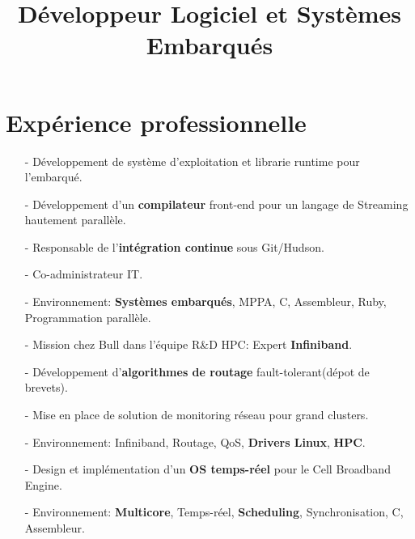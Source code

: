 \documentclass[10pt,a4paper]{moderncv}
\title{Développeur Logiciel et Systèmes \newline{}Embarqués}
\begin{document}
\maketitle
\section{Expérience professionnelle}
{
\begin{itemize}
\item[-]{Développement de système d'exploitation et librarie runtime pour l'embarqué.}
\item[-]{Développement d'un \textbf{compilateur} front-end pour un langage de Streaming hautement parallèle.}
\item[-]{Responsable de l'\textbf{intégration continue} sous Git/Hudson.}
\item[-]{Co-administrateur IT.}
\item[-]{Environnement: \textbf{Systèmes embarqués}, MPPA, C, Assembleur, Ruby, Programmation parallèle.}
\end{itemize}
}

{
\begin{itemize}
\item[-]{Mission chez Bull dans l'équipe R\&D HPC: Expert \textbf{Infiniband}.}
\item[-]{Développement d'\textbf{algorithmes de routage} fault-tolerant(dépot de brevets).}
\item[-]{Mise en place de solution de monitoring réseau pour grand clusters.}
\item[-]{Environnement: Infiniband, Routage, QoS, \textbf{Drivers Linux}, \textbf{HPC}.}
\end{itemize}
}

{
\begin{itemize}
\item[-]{Design et implémentation d'un \textbf{OS temps-réel} pour le Cell Broadband Engine.}
\item[-]{Environnement: \textbf{Multicore}, Temps-réel, \textbf{Scheduling}, Synchronisation, C, Assembleur.}
\end{itemize}
}
\end{document}
